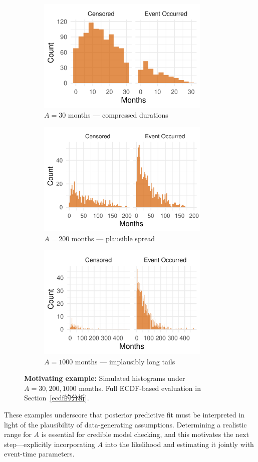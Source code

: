 \begin{example}
\begin{figure}[H]
\centering
\begin{subfigure}[t]{0.45\textwidth}
  \centering
  \includegraphics[height=5.5cm,width=\linewidth]{images/fake_duration_hist_a30.pdf}   %
  \caption{{\small $A=30$ months — compressed durations}}
  \label{fig:fake-hist_a30}
\end{subfigure}
\begin{subfigure}[t]{0.45\textwidth}
  \centering
  \includegraphics[height=5.5cm,width=\linewidth]{images/fake_duration_hist_a200.pdf}   %
  \caption{{\small $A=200$ months — plausible spread}}
  \label{fig:fake-hist_a200}
\end{subfigure}
\begin{subfigure}[t]{0.5\textwidth}
  \centering
  \includegraphics[height=5.5cm,width=\linewidth]{images/fake_duration_hist_a1000.pdf}   %
  \caption{{\small $A=1000$ months — implausibly long tails}}
  \label{fig:fake-hist_a1000}
\end{subfigure}
\caption{{\small \textbf{Motivating example:} Simulated histograms under $A=30,200,1000$ months. Full ECDF-based evaluation in Section~\ref{ecdf的分析}.}}
\label{fig:ppc-A30}
\end{figure}
These examples underscore that posterior predictive fit must be interpreted in light of the plausibility of data-generating assumptions. Determining a realistic range for $A$ is essential for credible model checking, and this motivates the next step—explicitly incorporating $A$ into the likelihood and estimating it jointly with event-time parameters.
\end{example}